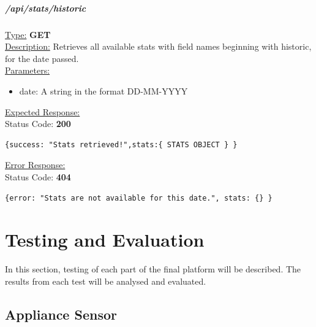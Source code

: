 \documentclass[draft,preprint,12pt,3p]{elsarticle}
\newcommand{\forceindent}{\leavevmode{\parindent=1em\indent}}
\begin{document}
\subparagraph*{/api/stats/historic}
\underline{Type:} \textbf{GET}\\

\underline{Description:} Retrieves all available stats with field names beginning with historic, for the date passed.\\

\underline{Parameters:}
\begin{itemize}
\item date: A string in the format DD-MM-YYYY
\end{itemize}

\underline{Expected Response:}\\[5pt]
\forceindent Status Code: \textbf{200} \\
\begin{verbatim}
{success: "Stats retrieved!",stats:{ STATS OBJECT } }
\end{verbatim}
\underline{Error Response:}\\[5pt]
\forceindent Status Code: \textbf{404} \\
\begin{verbatim}
{error: "Stats are not available for this date.", stats: {} }
\end{verbatim}

\clearpage

\section{Testing and Evaluation}
In this section, testing of each part of the final platform will be described. The results from each test will be analysed and evaluated.
\subsection{Appliance Sensor}
\end{document}
